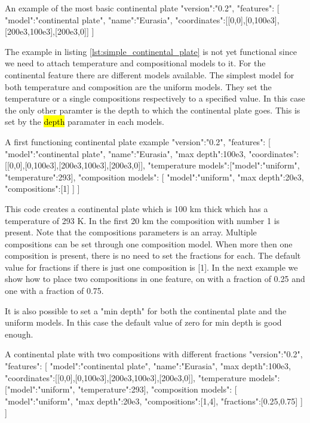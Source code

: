 \documentclass{book}
\begin{document}
\begin{javascriptcode}[label=lst:simple_continental_plate]{An example of the most basic continental plate}{}
{
  "version":"0.2",
  "features":
  [
    {
      "model":"continental plate", "name":"Eurasia",
      "coordinates":[[0,0],[0,100e3],[200e3,100e3],[200e3,0]]
    }
  ]
}
\end{javascriptcode}

The example in listing \ref{lst:simple_continental_plate} is not yet functional since we need to attach temperature and compositional models to it. For the continental feature there are different models available. The simplest model for both temperature and composition are the uniform models. They set the temperature or a single compositions respectively to a specified value. In this case the only other paramter is the depth to which the continental plate goes. This is set by the \hl{depth} paramater in each models.

\begin{javascriptcode}{A first functioning continental plate example}{}
{
  "version":"0.2",
  "features":
  [
    {
      "model":"continental plate", "name":"Eurasia", "max depth":100e3,
      "coordinates":[[0,0],[0,100e3],[200e3,100e3],[200e3,0]],
      "temperature models":[{"model":"uniform", "temperature":293}],
      "composition models":
      [
        {"model":"uniform", "max depth":20e3, "compositions":[1]}
      ]
    }
  ]
}
\end{javascriptcode}

This code creates a continental plate which is 100 km thick which has a temperature of 293 K. In the first 20 km the composition with number 1 is present. Note that the compositions parameters is an array. Multiple compositions can be set through one composition model. When more then one composition is present, there is no need to set the fractions for each. The default value for fractions if there is just one composition is [1]. In the next example we show how to place two compositions in one feature, on with a fraction of 0.25 and one with a fraction of 0.75.
\begin{remark}
It is also possible to set a "min depth" for both the continental plate and the uniform models. In this case the default value of zero for min depth is good enough.
\end{remark}

\begin{javascriptcode}{A continental plate with two compositions with different fractions}{}
{
  "version":"0.2",
  "features":
  [
    {
      "model":"continental plate", "name":"Eurasia", "max depth":100e3,
      "coordinates":[[0,0],[0,100e3],[200e3,100e3],[200e3,0]],
      "temperature models":[{"model":"uniform", "temperature":293}],
      "composition models":
      [
        {
          "model":"uniform", "max depth":20e3, "compositions":[1,4], 
          "fractions":[0.25,0.75]
        }
      ]
    }
  ]
}
\end{javascriptcode}
\end{document}
